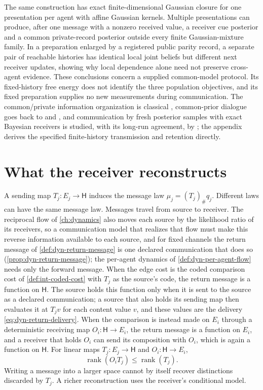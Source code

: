The same construction has exact finite-dimensional Gaussian closure for one presentation per agent with affine Gaussian kernels. Multiple presentations can produce, after one message with a nonzero received value, a receiver cue posterior and a common private-record posterior outside every finite Gaussian-mixture family. In a preparation enlarged by a registered public parity record, a separate pair of reachable histories has identical local joint beliefs but different next receiver updates, showing why local dependence alone need not preserve cross-agent evidence. These conclusions concern a supplied common-model protocol. Its fixed-history free energy does not identify the three population objectives, and its fixed preparation supplies no new measurements during communication. The common/private information organization is classical \citep{Nayyar2013CommonInformation}, common-prior dialogue goes back to \citet{Aumann1976} and \citet{GeanakoplosPolemarchakis1982}, and communication by fresh posterior samples with exact Bayesian receivers is studied, with its long-run agreement, by \citet{DeshpandeMosselSohn2022}; the appendix derives the specified finite-history transmission and retention directly.

\section{What the receiver reconstructs}

A sending map $T_j:E_j\to\mathsf H$ induces the message law $\mu_j=(T_j)_\#q_j$. Different laws can have the same message law. Messages travel from source to receiver. The reciprocal flow of \cref{ch:dynamics} also moves each source by the likelihood ratio of its receivers, so a communication model that realizes that flow must make this reverse information available to each source, and for fixed channels the return message of \cref{def:dyn-return-message} is one declared communication that does so (\cref{prop:dyn-return-message}); the per-agent dynamics of \cref{def:dyn-per-agent-flow} needs only the forward message. When the edge cost is the coded comparison cost of \cref{def:int-coded-cost} with $T_j$ as the source's code, the return message is a function on $\mathsf H$. The source holds this function only when it is sent to the source as a declared communication; a source that also holds its sending map then evaluates it at $T_jv$ for each content value $v$, and these values are the delivery \cref{eq:dyn-return-delivery}. When the comparison is instead made on $E_i$ through a deterministic receiving map $O_i:\mathsf H\to E_i$, the return message is a function on $E_i$, and a receiver that holds $O_i$ can send its composition with $O_i$, which is again a function on $\mathsf H$. For linear maps $T_j:E_j\to\mathsf H$ and $O_i:\mathsf H\to E_i$,
\begin{equation}
\operatorname{rank}(O_iT_j)\leq\operatorname{rank}(T_j).
\label{eq:message-rank}
\end{equation}
Writing a message into a larger space cannot by itself recover distinctions discarded by $T_j$. A richer reconstruction uses the receiver's conditional model.

